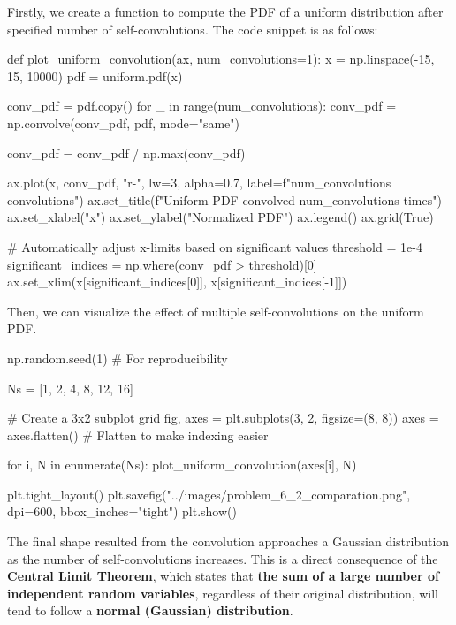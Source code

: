 \documentclass[a4paper, 10pt]{article}
\begin{document}
\begin{solution}
Firstly, we create a function to compute the PDF of a uniform distribution after specified number of self-convolutions. The code snippet is as follows:
\begin{codingbox}
def plot_uniform_convolution(ax, num_convolutions=1):
    x = np.linspace(-15, 15, 10000)
    pdf = uniform.pdf(x)

    conv_pdf = pdf.copy()
    for _ in range(num_convolutions):
        conv_pdf = np.convolve(conv_pdf, pdf, mode="same")

    conv_pdf = conv_pdf / np.max(conv_pdf)

    ax.plot(x, conv_pdf, "r-", lw=3, alpha=0.7, label=f"{num_convolutions} convolutions")
    ax.set_title(f"Uniform PDF convolved {num_convolutions} times")
    ax.set_xlabel("x")
    ax.set_ylabel("Normalized PDF")
    ax.legend()
    ax.grid(True)

    # Automatically adjust x-limits based on significant values
    threshold = 1e-4
    significant_indices = np.where(conv_pdf > threshold)[0]
    ax.set_xlim(x[significant_indices[0]], x[significant_indices[-1]])
\end{codingbox}

\newpage

Then, we can visualize the effect of multiple self-convolutions on the uniform PDF.
\begin{codingbox}
np.random.seed(1)  # For reproducibility

Ns = [1, 2, 4, 8, 12, 16]

# Create a 3x2 subplot grid
fig, axes = plt.subplots(3, 2, figsize=(8, 8))
axes = axes.flatten()  # Flatten to make indexing easier

for i, N in enumerate(Ns):
    plot_uniform_convolution(axes[i], N)
    
plt.tight_layout()
plt.savefig("../images/problem_6_2_comparation.png", dpi=600, bbox_inches="tight")
plt.show()
\end{codingbox}

The final shape resulted from the convolution approaches a Gaussian distribution as the number of self-convolutions increases.
This is a direct consequence of the \textbf{Central Limit Theorem},
which states that \textbf{the sum of a large number of independent random variables},
regardless of their original distribution, will tend to follow a \textbf{normal (Gaussian) distribution}.


\end{solution}
\end{document}
